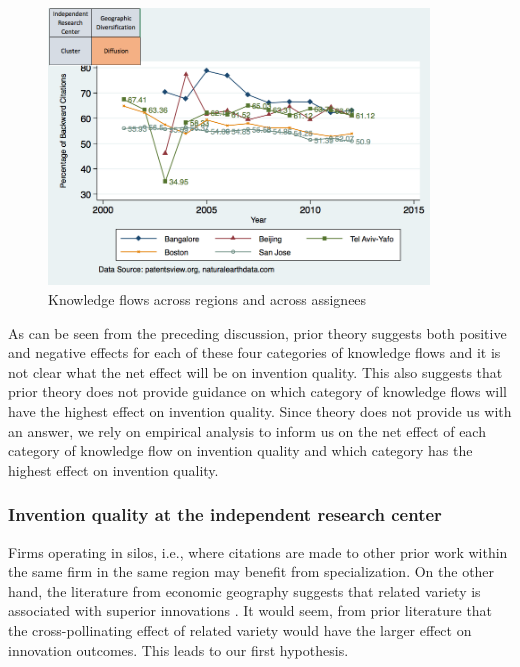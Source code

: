 \documentclass[12pt,letterpaper]{article}
\begin{document}
\begin{figure}[h!]
\begin{centering}
  \caption{Knowledge flows across regions and across assignees}
  \label{fig:SMSDiffRegionDiffAssigneeFlows}
  \includegraphics[width=0.90\textwidth]{SMSDiffRegionDiffAssigneeFlows}
\end{centering}
\end{figure}

As can be seen from the preceding discussion, prior theory suggests both positive and negative effects for each of these four categories of knowledge flows and it is not clear what the net effect will be on invention quality. This also suggests that prior theory does not provide guidance on which category of knowledge flows will have the highest effect on invention quality.  Since theory does not provide us with an answer, we rely on empirical analysis to inform us on the net effect of each category of knowledge flow on invention quality and which category has the highest effect on invention quality. \par


\subsubsection{Invention quality at the independent research center}
Firms operating in silos, i.e., where citations are made to other prior work within the same firm in the same region may benefit from specialization. On the other hand, the literature from economic geography suggests that related variety is associated with superior innovations  \citep{Boschma2009, Frenken2007}. It would seem, from prior literature that the cross-pollinating effect of related variety would have the larger effect on innovation outcomes. This leads to our first hypothesis.\\
\end{document}
